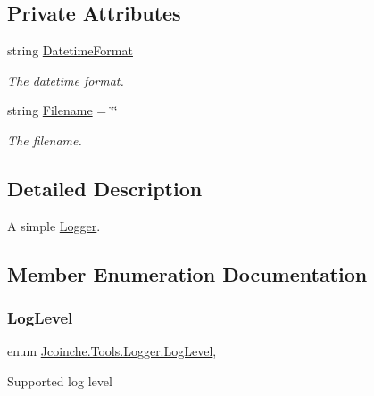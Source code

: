 \subsection*{Private Attributes}
\begin{DoxyCompactItemize}
\item 
string \hyperlink{class_jcoinche_1_1_tools_1_1_logger_a16490a5d7215f66a933bd360242e1a30}{Datetime\+Format}
\begin{DoxyCompactList}\small\item\em The datetime format. \end{DoxyCompactList}\item 
string \hyperlink{class_jcoinche_1_1_tools_1_1_logger_ac62c61b52dd90826b0bc03bf2ab6823d}{Filename} = \char`\"{}\char`\"{}
\begin{DoxyCompactList}\small\item\em The filename. \end{DoxyCompactList}\end{DoxyCompactItemize}


\subsection{Detailed Description}
A simple \hyperlink{class_jcoinche_1_1_tools_1_1_logger}{Logger}. 



\subsection{Member Enumeration Documentation}
\mbox{\label{class_jcoinche_1_1_tools_1_1_logger_ab4fd521c5dbf009c3be7606a842a6e5b}} 
\subsubsection{\texorpdfstring{Log\+Level}{LogLevel}}
{\footnotesize\ttfamily enum \hyperlink{class_jcoinche_1_1_tools_1_1_logger_ab4fd521c5dbf009c3be7606a842a6e5b}{Jcoinche.\+Tools.\+Logger.\+Log\+Level}\hspace{0.3cm}{\ttfamily [strong]}, {\ttfamily [private]}}



Supported log level 



